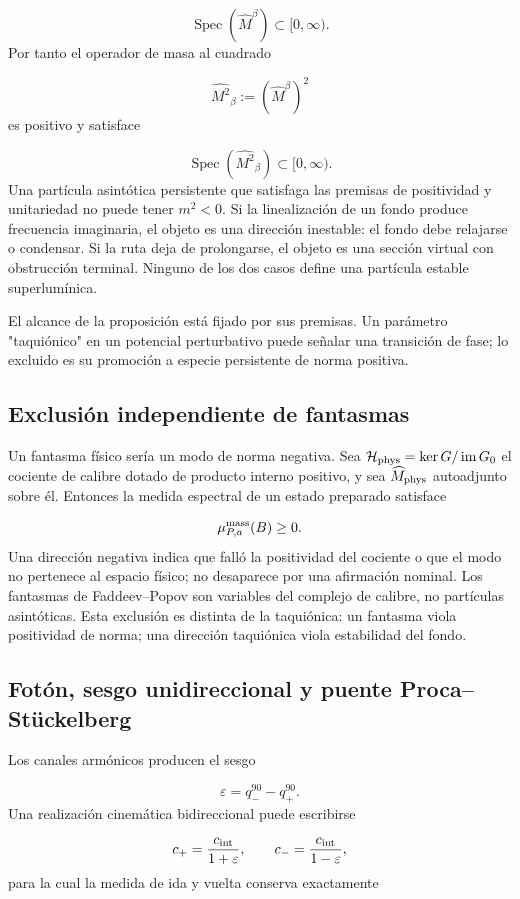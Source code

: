 \[
\operatorname{Spec}(\widehat M^\beta)\subset[0,\infty).
\]
Por tanto el operador de masa al cuadrado

\[
\widehat{M^2}_{\beta}:=(\widehat M^\beta)^2
\]
es positivo y satisface

\[
\operatorname{Spec}(\widehat{M^2}_{\beta})\subset[0,\infty).
\]
Una partícula asintótica persistente que satisfaga las premisas de positividad y unitariedad no puede tener \(m^2<0\). Si la linealización de un fondo produce frecuencia imaginaria, el objeto es una dirección inestable: el fondo debe relajarse o condensar. Si la ruta deja de prolongarse, el objeto es una sección virtual con obstrucción terminal. Ninguno de los dos casos define una partícula estable superlumínica.

El alcance de la proposición está fijado por sus premisas. Un parámetro "taquiónico" en un potencial perturbativo puede señalar una transición de fase; lo excluido es su promoción a especie persistente de norma positiva.

\subsection{Exclusión independiente de fantasmas}
Un fantasma físico sería un modo de norma negativa. Sea \(\mathcal H_{\rm phys}=\ker G/\operatorname{im}G_0\) el cociente de calibre dotado de producto interno positivo, y sea \(\widehat M_{\rm phys}\) autoadjunto sobre él. Entonces la medida espectral de un estado preparado satisface

\[
\mu_{P,a}^{\rm mass}(B)\ge0.
\]
Una dirección negativa indica que falló la positividad del cociente o que el modo no pertenece al espacio físico; no desaparece por una afirmación nominal. Los fantasmas de Faddeev--Popov son variables del complejo de calibre, no partículas asintóticas. Esta exclusión es distinta de la taquiónica: un fantasma viola positividad de norma; una dirección taquiónica viola estabilidad del fondo.

\subsection{Fotón, sesgo unidireccional y puente Proca--Stückelberg}
Los canales armónicos producen el sesgo

\[
\varepsilon=q_-^{90}-q_+^{90}.
\]
Una realización cinemática bidireccional puede escribirse

\[
c_+=\frac{c_{\rm int}}{1+\varepsilon},
\qquad
c_-=\frac{c_{\rm int}}{1-\varepsilon},
\]
para la cual la medida de ida y vuelta conserva exactamente

